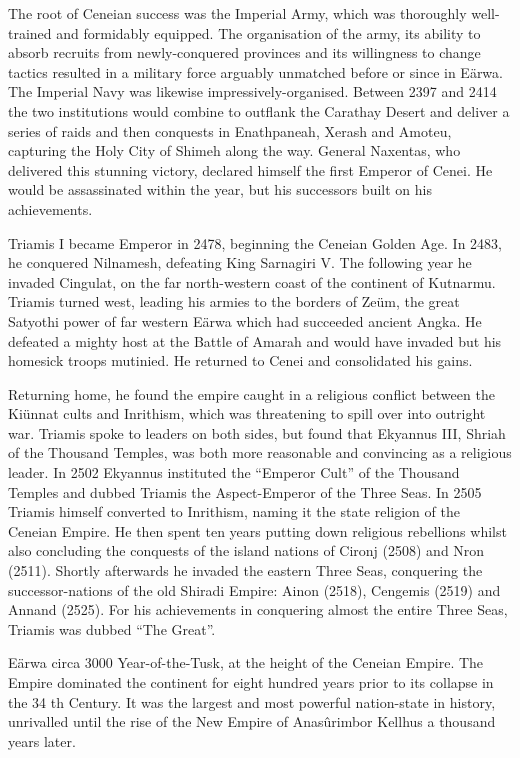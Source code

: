 \documentclass[]{book}
\begin{document}
The root of Ceneian success was the Imperial Army, which was thoroughly well-trained
and formidably equipped. The organisation of the army, its ability to absorb recruits
from newly-conquered provinces and its willingness to change tactics resulted in a
military force arguably unmatched before or since in Eärwa. The Imperial Navy was
likewise impressively-organised. Between 2397 and 2414 the two institutions would
combine to outflank the Carathay Desert and deliver a series of raids and then
conquests in Enathpaneah, Xerash and Amoteu, capturing the Holy City of Shimeh
along the way. General Naxentas, who delivered this stunning victory, declared himself
the first Emperor of Cenei. He would be assassinated within the year, but his successors
built on his achievements.

Triamis I became Emperor in 2478, beginning the Ceneian Golden Age. In 2483, he
conquered Nilnamesh, defeating King Sarnagiri V. The following year he invaded
Cingulat, on the far north-western coast of the continent of Kutnarmu. Triamis turned
west, leading his armies to the borders of Zeüm, the great Satyothi power of far western
Eärwa which had succeeded ancient Angka. He defeated a mighty host at the Battle of
Amarah and would have invaded but his homesick troops mutinied. He returned to
Cenei and consolidated his gains.

Returning home, he found the empire caught in a religious conflict between the
Kiünnat cults and Inrithism, which was threatening to spill over into outright war.
Triamis spoke to leaders on both sides, but found that Ekyannus III, Shriah of the
Thousand Temples, was both more reasonable and convincing as a religious leader. In
2502 Ekyannus instituted the ``Emperor Cult'' of the Thousand Temples and dubbed
Triamis the Aspect-Emperor of the Three Seas. In 2505 Triamis himself converted to
Inrithism, naming it the state religion of the Ceneian Empire. He then spent ten years
putting down religious rebellions whilst also concluding the conquests of the island
nations of Cironj (2508) and Nron (2511). Shortly afterwards he invaded the eastern
Three Seas, conquering the successor-nations of the old Shiradi Empire: Ainon (2518),
Cengemis (2519) and Annand (2525). For his achievements in conquering almost the
entire Three Seas, Triamis was dubbed ``The Great''.

Eärwa circa 3000 Year-of-the-Tusk, at the height of the Ceneian Empire. The Empire dominated the
continent for eight hundred years prior to its collapse in the 34 th Century. It was the largest and most
powerful nation-state in history, unrivalled until the rise of the New Empire of Anasûrimbor Kellhus a
thousand years later.
\end{document}
